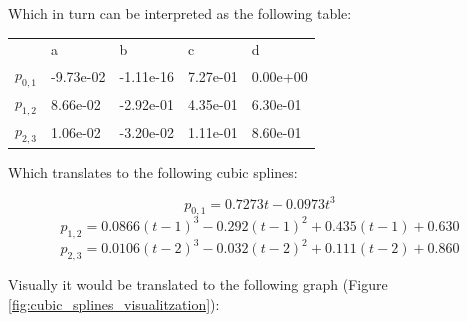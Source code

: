 \documentclass[]{article}
\begin{document}
Which in turn can be interpreted as the following table:

\begin{table}[h]
\begin{tabular}{lllll}
           & a         & b         & c        & d        \\
$p_{0,1}$ & -9.73e-02 & -1.11e-16 & 7.27e-01 & 0.00e+00 \\
$p_{1,2}$ & 8.66e-02  & -2.92e-01 & 4.35e-01 & 6.30e-01 \\
$p_{2,3}$ & 1.06e-02  & -3.20e-02 & 1.11e-01 & 8.60e-01
\end{tabular}
\end{table}

Which translates to the following cubic splines:

\[p_{0,1}=0.7273t-0.0973t^3\]
\[p_{1,2}=0.0866(t-1)^3-0.292(t-1)^2+0.435(t-1)+0.630\]
\[p_{2,3}=0.0106(t-2)^3-0.032(t-2)^2+0.111(t-2)+0.860\]

Visually it would be translated to the following graph (Figure \ref{fig:cubic_splines_visualitzation}):
\end{document}
